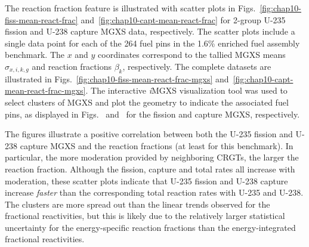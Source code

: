 
The reaction fraction feature is illustrated with scatter plots in Figs.~\ref{fig:chap10-fiss-mean-react-frac} and~\ref{fig:chap10-capt-mean-react-frac} for 2-group U-235 fission and U-238 capture \ac{MGXS} data, respectively. The scatter plots include a single data point for each of the 264 fuel pins in the 1.6\% enriched fuel assembly benchmark. The $x$ and $y$ coordinates correspond to the tallied \ac{MGXS} means $\hat{\sigma}_{x,i,k,g}$ and reaction fractions $\beta_{k}$, respectively. The complete datasets are illustrated in Figs.~\ref{fig:chap10-fiss-mean-react-frac-mgxs} and~\ref{fig:chap10-capt-mean-react-frac-mgxs}. The interactive \textit{i}\ac{MGXS} visualization tool was used to select clusters of \ac{MGXS} and plot the geometry to indicate the associated fuel pins, as displayed in Figs.~ and~ for the fission and capture \ac{MGXS}, respectively. 

The figures illustrate a positive correlation between both the U-235 fission and U-238 capture \ac{MGXS} and the reaction fractions (at least for this benchmark). In particular, the more moderation provided by neighboring \acp{CRGT}, the larger the reaction fraction. Although the fission, capture and total rates all increase with moderation, these scatter plots indicate that U-235 fission and U-238 capture increase \textit{faster} than the corresponding total reaction rates with U-235 and U-238. The clusters are more spread out than the linear trends observed for the fractional reactivities, but this is likely due to the relatively larger statistical uncertainty for the energy-specific reaction fractions than the energy-integrated fractional reactivities.

%
%

